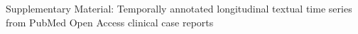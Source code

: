 
\begin{center}
    {\LARGE Supplementary Material: Temporally annotated longitudinal textual time series from PubMed Open Access clinical case reports}
\end{center}
 



